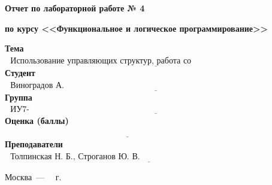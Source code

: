 \begin{titlepage}
	
	\begin{center}
		\Large\textbf{Отчет по лабораторной работе № 4}
		
		\Large\textbf{по курсу <<Функциональное и логическое программирование>>}
		
		\textbf{\newline}		
	\end{center}
	
	\noindent\textbf{Тема} $\underline{\text{~~Использование управляющих структур, работа со списками~~~~~~~~~~~~~~~~~~~~~~~~~~~~~~~~~~~~~~~~~~~~~~~~~~~~~~~~~~~~~~~~~~~~~~~~}}$\newline\newline
	\noindent\textbf{Студент} $\underline{\text{~~Виноградов А. О.~~~~~~~~~~~~~~~~~~~~~~~~~~~~~~~~~~~~~~~~~~~~~~~~~~~~~~~~~~~~~~~~~~~~~~~~~~~~~~~~~~~~~~}}$\newline\newline
	\noindent\textbf{Группа} $\underline{\text{~~ИУ7-66Б~~~~~~~~~~~~~~~~~~~~~~~~~~~~~~~~~~~~~~~~~~~~~~~~~~~~~~~~~~~~~~~~~~~~~~~~~~~~~~~~~~~~~~~~~~~~~~~~~~~~}}$\newline\newline
	\noindent\textbf{Оценка (баллы)} $\underline{\textbf{~~~~~~~~~~~~~~~~~~~~~~~~~~~~~~~~~~~~~~~~~~~~~~~~~~~~~~~~~~~~~~~~~~~~~~~~~~~~~~~~~~~~~~~~}}$\newline\newline
	\noindent\textbf{Преподаватели} $\underline{\text{~~Толпинская Н. Б., Строганов Ю. В.~~~~~~~~~~~~~~~~~~~~~~~~~~~~~~~~~~~~~~~~~~~~~~~~~~~~~~~}}$\newline
	
	\begin{center}
		\vfill
		Москва~---~\the\year
		~г.
	\end{center}
	\restoregeometry
	
\end{titlepage}